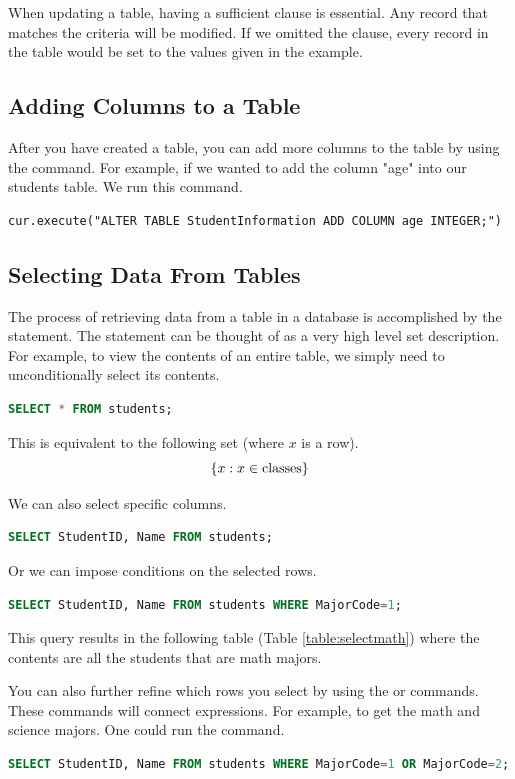\begin{info}
When updating a table, having a sufficient  clause is essential.  Any record that matches the criteria will be modified.
If we omitted the  clause, every record in the table would be set to the values given in the example.
\end{info}

\subsection*{Adding Columns to a Table}
After you have created a table, you can add more columns to the table by using the  command.  For example, if we wanted to add the column "age" into our students table.  We run this command.
\begin{lstlisting}
cur.execute("ALTER TABLE StudentInformation ADD COLUMN age INTEGER;")
\end{lstlisting}

\subsection*{Selecting Data From Tables}
The process of retrieving data from a table in a database is accomplished by the  statement.
The  statement can be thought of as a very high level set description.
For example, to view the contents of an entire table, we simply need to unconditionally select its contents.
\begin{lstlisting}[language=SQL]
SELECT * FROM students;
\end{lstlisting}
This is equivalent to the following set (where $x$ is a row).
\[ \lbrace x:x \in \text{classes}\rbrace \]

We can also select specific columns.
\begin{lstlisting}[language=SQL]
SELECT StudentID, Name FROM students;
\end{lstlisting}
Or we can impose conditions on the selected rows.
\begin{lstlisting}[language=SQL]
SELECT StudentID, Name FROM students WHERE MajorCode=1;
\end{lstlisting}
This query results in the following table (Table \ref{table:selectmath}) where the contents are all the students that are math majors.

You can also further refine which rows you select by using the  or  commands.  These commands will connect expressions.  For example, to get the math and science majors. One could run the command.
\begin{lstlisting}[language=SQL]
SELECT StudentID, Name FROM students WHERE MajorCode=1 OR MajorCode=2;
\end{lstlisting}


